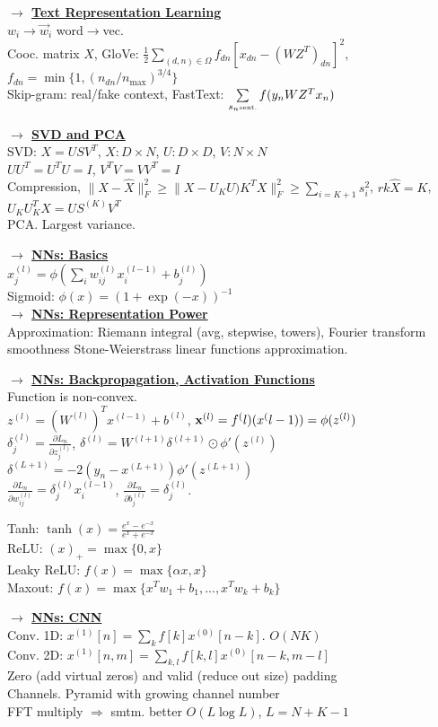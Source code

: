 \documentclass[11pt]{article}
\newcommand{\myvector}[1]{{\bf{#1}}}
\newcommand{\x}{\myvector{x}}
\newcommand{\mytitle}[1]{ {\bf $\rightarrow$ \underline{#1}}\\}
\begin{document}
\begin{multicols*}{2}
\mytitle{Text Representation Learning}
$w_i\to\vec{w}_i$ word$\rightarrow$vec.\\
Cooc. matrix $X$, GloVe: $\frac{1}{2}\sum\limits_{(d,n)\in\Omega}f_{dn}\left[x_{dn}-(WZ^T)_{dn}\right]^2$, $f_{dn}=\min\{1,(n_{dn}/n_{\max})^{3/4}\}$\\
Skip-gram: real/fake context, FastText: $\sum\limits_{s_n\mbox{\tiny sent.}}f(y_nWZ^Tx_n)$

\mytitle{SVD and PCA}
SVD: $X=USV^T$, $X\colon D\times N$, $U\colon D\times D$, $V\colon N\times N$\\
$UU^T=U^TU=I$, $V^TV=VV^T=I$\\
Compression, $\|X-\hat{X}\|^2_F\geqslant \|X-U_KU)K^TX\|^2_F\geqslant\sum\limits_{i=K+1}s_i^2$, $rk\hat{X}=K$, $U_KU_K^TX=US^{(K)}V^T$\\
PCA. Largest variance.

\mytitle{NNs: Basics}
$x_j^{(l)}=\phi\left(\sum\limits_iw_{ij}^{(l)}x_i^{(l-1)}+b_j^{(l)}\right)$\\
Sigmoid: $\phi(x)=(1+\exp(-x))^{-1}$\\

\mytitle{NNs: Representation Power}
Approximation: Riemann integral (avg, stepwise, towers), Fourier transform smoothness
Stone-Weierstrass linear functions approximation.

\mytitle{NNs: Backpropagation, Activation Functions}
Function is non-convex.\\
$z^{(l)}=(W^{(l)})^Tx^{(l-1)}+b^{(l)}$, $\x^{(l)}=f^({l})(x^({l-1}))=\phi(z^{(l)})$\\
$\delta_j^{(l)}=\frac{\partial L_n}{\partial z_j^{(l)}}$, $\delta^{(l)}=W^{(l+1)}\delta^{(l+1)}\odot \phi'(z^{(l)})$\\
$\delta^{(L+1)}=-2(y_n-x^{(L+1)})\phi'(z^{(L+1)})$\\
$\frac{\partial L_n}{\partial w_{ij}^{(l)}}=\delta^{(l)}_jx_i^{(l-1)}$,
$\frac{\partial L_n}{\partial b_{j}^{(l)}}=\delta^{(l)}_j$.

Tanh: $\tanh(x)=\frac{e^x-e^{-x}}{e^x+e^{-x}}$\\
ReLU: $(x)_+=\max\{0, x\}$\\
Leaky ReLU: $f(x)=\max\{\alpha x, x\}$\\
Maxout: $f(x)=\max\{x^Tw_1+b_1,...,x^Tw_k+b_k\}$

\mytitle{NNs: CNN}
Conv. 1D: $x^{(1)}[n]=\sum\limits_kf[k]x^{(0)}[n-k]$. $O(NK)$\\
Conv. 2D: $x^{(1)}[n,m]=\sum\limits_{k,l}f[k,l]x^{(0)}[n-k,m-l]$\\
Zero (add virtual zeros) and valid (reduce out size) padding\\
Channels. Pyramid with growing channel number\\
FFT multiply $\Rightarrow$ smtm. better $O(L\log L)$, $L=N+K-1$\\


\end{multicols*}
\end{document}
